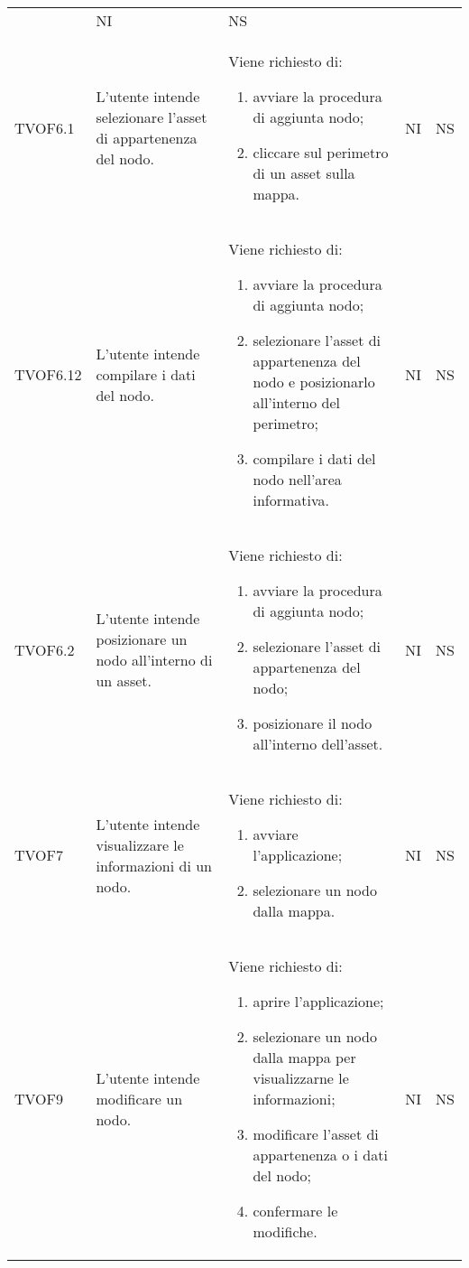 \begin{longtable}{p{1.8cm}!{\VRule[1pt]}p{3.5cm}!{\VRule[1pt]}p{5.5cm}!{\VRule[1pt]}p{1cm}!{\VRule[1pt]}p{1cm}}
\begin{enumerate}
	\end{enumerate} & NI & NS \\ 
	TVOF6.1 & L'utente intende selezionare l'asset di appartenenza del nodo. & Viene richiesto di: \begin{enumerate} 
		\item avviare la procedura di aggiunta nodo; 
		\item cliccare sul perimetro di un asset sulla mappa. 
	\end{enumerate} & NI & NS \\ 
	TVOF6.12 & L'utente intende compilare i dati del nodo. & Viene richiesto di: \begin{enumerate} 
		\item avviare la procedura di aggiunta nodo;
		\item selezionare l'asset di appartenenza del nodo e posizionarlo all'interno del perimetro; 
		\item compilare i dati del nodo nell'area informativa. 
	\end{enumerate} & NI & NS \\ 
	TVOF6.2 & L'utente intende posizionare un nodo all'interno di un asset. & Viene richiesto di: \begin{enumerate} 
		\item avviare la procedura di aggiunta nodo; 
		\item selezionare l'asset di appartenenza del nodo; 
		\item posizionare il nodo all'interno dell'asset. 
	\end{enumerate} & NI & NS \\ 
	TVOF7 & L'utente intende visualizzare le informazioni di un nodo. & Viene richiesto di: \begin{enumerate} 
		\item avviare l'applicazione; 
		\item selezionare un nodo dalla mappa. 
	\end{enumerate} & NI & NS \\ 
	TVOF9 & L'utente intende modificare un nodo. & Viene richiesto di: \begin{enumerate} 
		\item aprire l'applicazione; 
		\item selezionare un nodo dalla mappa per visualizzarne le informazioni; 
		\item modificare l'asset di appartenenza o i dati del nodo; 
		\item confermare le modifiche. 
	\end{enumerate} & NI & NS \\ 

\end{longtable}
